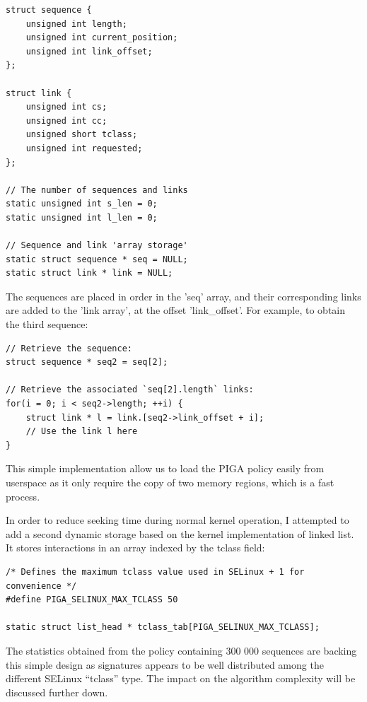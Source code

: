 \documentclass[pdftex,a4paper,titlepage,11pt]{article}
\begin{document}
\begin{lstlisting}
struct sequence {
	unsigned int length;
	unsigned int current_position;
	unsigned int link_offset;
};

struct link {
	unsigned int cs;
	unsigned int cc;
	unsigned short tclass;
	unsigned int requested;
};

// The number of sequences and links
static unsigned int s_len = 0;
static unsigned int l_len = 0;

// Sequence and link 'array storage'
static struct sequence * seq = NULL;
static struct link * link = NULL;
\end{lstlisting}

\medskip

The sequences are placed in order in the 'seq' array, and their corresponding
links are added to the 'link array', at the offset 'link\_offset'. For example,
to obtain the third sequence:

\begin{lstlisting}
// Retrieve the sequence:
struct sequence * seq2 = seq[2];

// Retrieve the associated `seq[2].length` links:
for(i = 0; i < seq2->length; ++i) {
	struct link * l = link.[seq2->link_offset + i];
	// Use the link l here
}
\end{lstlisting}

\medskip

This simple implementation allow us to load the PIGA policy easily from
userspace as it only require the copy of two memory regions, which is a fast
process.

\bigskip

In order to reduce seeking time during normal kernel operation, I attempted to
add a second dynamic storage based on the kernel implementation of linked list.
It stores interactions in an array indexed by the tclass field:

\begin{lstlisting}
/* Defines the maximum tclass value used in SELinux + 1 for convenience */
#define PIGA_SELINUX_MAX_TCLASS 50

static struct list_head * tclass_tab[PIGA_SELINUX_MAX_TCLASS];
\end{lstlisting}

\medskip

The statistics obtained from the policy containing 300 000 sequences are
backing this simple design as signatures appears to be well distributed among
the different SELinux ``tclass'' type. The impact on the algorithm complexity
will be discussed further down.
\end{document}
